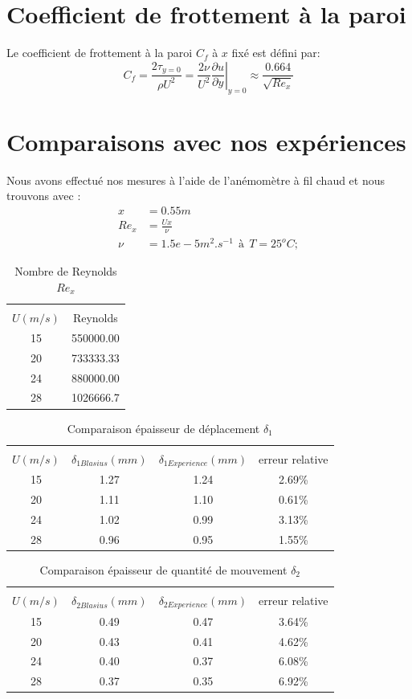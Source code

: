 \section{Coefficient de frottement à la paroi}
Le coefficient de frottement à la paroi $C_{f}$ à $x$ fixé est défini par:
\begin{equation}
	C_{f} =
	\frac{2\tau_{y=0}}{\rho U^{2}} =
	\frac{2\nu}{U^{2}}
	\left.
	\frac{\partial u}{\partial y}
	\right|_{y = 0} \approx \frac{0.664}{\sqrt{Re_{x}}}
\end{equation}
\section{Comparaisons avec nos expériences}
Nous avons effectué nos mesures à l'aide de l'anémomètre à fil chaud et nous trouvons avec :
\begin{align*}
	x &= 0.55m\\
	Re_{x} &= \frac{Ux}{\nu}\\
	\nu &= 1.5e-5 m^{2}.s^{-1}~~\text{à}~~T = 25^{o}C; 
\end{align*}
\begin{table}[ht]
	\centering
	\begin{tabular}{cc}
		\hline\\
		$U(m/s)$ & Reynolds\\
		\hline
   15 & 550000.00\\
   20 & 733333.33\\
   24 & 880000.00\\
   28 & 1026666.7
	\end{tabular}
	\caption{Nombre de Reynolds $Re_{x}$}
\end{table}
\begin{table}[ht]
	\centering
	\begin{tabular}{cccc}
		\hline\\
		$U(m/s)$ & $\delta_{1Blasius}(mm)$ &
		$ \delta_{1Experience}(mm)$ & 
		 erreur relative\\
		\hline
		15   & 1.27   & 1.24   & 2.69\%\\
		20   & 1.11   & 1.10   & 0.61\%\\
		24   & 1.02   & 0.99   & 3.13\%\\
		28   & 0.96   & 0.95   & 1.55\%
	\end{tabular}
	\caption{Comparaison épaisseur de déplacement $\delta_{1}$}
\end{table}
\begin{table}[ht]
	\centering
	\begin{tabular}{cccc}
		\hline\\
		$U(m/s)$ & $\delta_{2Blasius}(mm)$ &
		$ \delta_{2Experience}(mm)$ & 
		 erreur relative\\
		\hline
   15 & 0.49   & 0.47   & 3.64\%\\
   20 & 0.43   & 0.41   & 4.62\%\\
   24 & 0.40   & 0.37   & 6.08\%\\
   28 & 0.37   & 0.35   & 6.92\%
	\end{tabular}
	\caption{Comparaison épaisseur de quantité de mouvement $\delta_{2}$}
\end{table}
